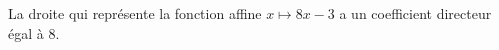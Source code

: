 La droite qui représente la fonction affine $x\mapsto 8x-3$ a un coefficient directeur égal à $8$.

\begin{reponses}
\end{reponses}

\begin{comment}

\end{comment}

